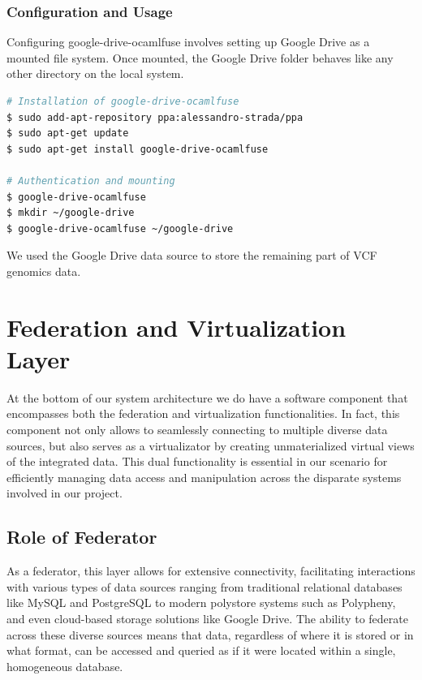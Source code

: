 \subsubsection{Configuration and Usage}
Configuring google-drive-ocamlfuse involves setting up Google Drive as a mounted file system. Once mounted, the Google Drive folder behaves like any other directory on the local system.
\begin{lstlisting}[language=bash, caption={google-drive-ocamlfuse Tool installation procedure}, label={lst:ocamlfuse}]
# Installation of google-drive-ocamlfuse
$ sudo add-apt-repository ppa:alessandro-strada/ppa
$ sudo apt-get update
$ sudo apt-get install google-drive-ocamlfuse

# Authentication and mounting
$ google-drive-ocamlfuse
$ mkdir ~/google-drive
$ google-drive-ocamlfuse ~/google-drive
\end{lstlisting}
We used the Google Drive data source to store the remaining part of \ac{VCF} genomics data.


\section{Federation and Virtualization Layer}
At the bottom of our system architecture we do have a software component that encompasses both the federation and virtualization functionalities. In fact, this component not only allows to seamlessly connecting to multiple diverse data sources, but also serves as a virtualizator by creating unmaterialized virtual views of the integrated data. This dual functionality is essential in our scenario for efficiently managing data access and manipulation across the disparate systems involved in our project.
\subsection{Role of Federator}
As a federator, this layer allows for extensive connectivity, facilitating interactions with various types of data sources ranging from traditional relational databases like MySQL and PostgreSQL to modern polystore systems such as Polypheny, and even cloud-based storage solutions like Google Drive. The ability to federate across these diverse sources means that data, regardless of where it is stored or in what format, can be accessed and queried as if it were located within a single, homogeneous database.
